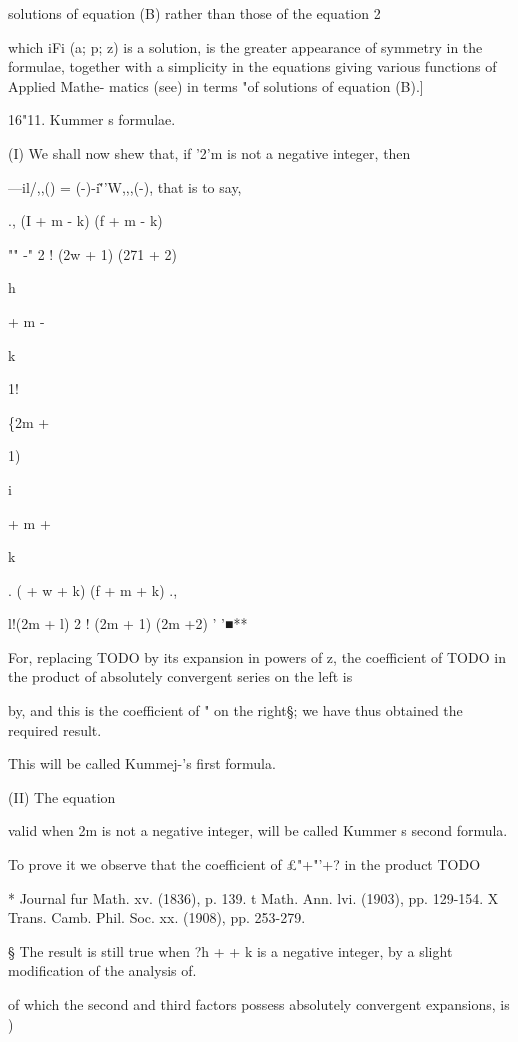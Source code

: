 solutions of equation (B) rather than those of the equation 2

which iFi (a; p; z) is a solution, is the greater appearance of
symmetry in the formulae, together with a simplicity in the equations
giving various functions of Applied Mathe- matics (see) in
terms "of solutions of equation (B).]

16"11. Kummer s formulae.

(I) We shall now shew that, if '2'm is not a negative integer, then

---il/,,() = (-)-i\~''W,,,(-), that is to say,

., (I + m - k) (f + m - k)

 "" -" 2 ! (2w + 1) (271 + 2)

h

+ m -

k

1!

\{2m +

1)

i

+ m +

k

  . ( + w + k) (f + m + k) ., 

l!(2m + l) 2 ! (2m + 1) (2m +2) ' '■**

For, replacing TODO by its expansion in powers of z, the coefficient
of TODO in the product of absolutely convergent series on the left is

by, and this is the coefficient of " on the right§; we have
thus obtained the required result.

This will be called Kummej-'s first formula.

(II) The equation

valid when 2m is not a negative integer, will be called Kummer s
second formula.

To prove it we observe that the coefficient of £"+"'+? in the product
TODO

* Journal fur Math. xv. (1836), p. 139. t Math. Ann. lvi. (1903), pp.
129-154. X Trans. Camb. Phil. Soc. xx. (1908), pp. 253-279.

§ The result is still true when ?h +  + k is a negative integer, by
a slight modification of the analysis of.

%
%

of which the second and third factors possess absolutely convergent
expansions, is )

